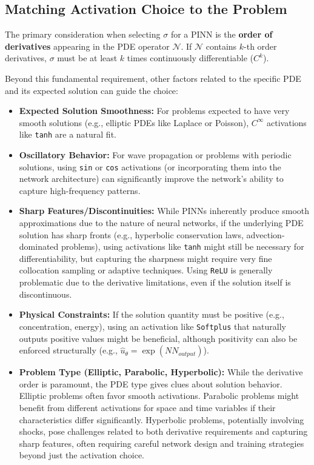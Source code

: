 \subsection{Matching Activation Choice to the Problem}

The primary consideration when selecting $\sigma$ for a PINN is the \textbf{order of derivatives} appearing in the PDE operator $\mathcal{N}$. If $\mathcal{N}$ contains $k$-th order derivatives, $\sigma$ must be at least $k$ times continuously differentiable ($C^k$).

Beyond this fundamental requirement, other factors related to the specific PDE and its expected solution can guide the choice:

\begin{itemize}
    \item \textbf{Expected Solution Smoothness:} For problems expected to have very smooth solutions (e.g., elliptic PDEs like Laplace or Poisson), $C^\infty$ activations like \texttt{tanh} are a natural fit.
    \item \textbf{Oscillatory Behavior:} For wave propagation or problems with periodic solutions, using \texttt{sin} or \texttt{cos} activations (or incorporating them into the network architecture) can significantly improve the network's ability to capture high-frequency patterns.
    \item \textbf{Sharp Features/Discontinuities:} While PINNs inherently produce smooth approximations due to the nature of neural networks, if the underlying PDE solution has sharp fronts (e.g., hyperbolic conservation laws, advection-dominated problems), using activations like \texttt{tanh} might still be necessary for differentiability, but capturing the sharpness might require very fine collocation sampling or adaptive techniques. Using \texttt{ReLU} is generally problematic due to the derivative limitations, even if the solution itself is discontinuous.
    \item \textbf{Physical Constraints:} If the solution quantity must be positive (e.g., concentration, energy), using an activation like \texttt{Softplus} that naturally outputs positive values might be beneficial, although positivity can also be enforced structurally (e.g., $\hat{u}_\theta = \exp(NN_{output})$).
    \item \textbf{Problem Type (Elliptic, Parabolic, Hyperbolic):} While the derivative order is paramount, the PDE type gives clues about solution behavior. Elliptic problems often favor smooth activations. Parabolic problems might benefit from different activations for space and time variables if their characteristics differ significantly. Hyperbolic problems, potentially involving shocks, pose challenges related to both derivative requirements and capturing sharp features, often requiring careful network design and training strategies beyond just the activation choice.
\end{itemize}

